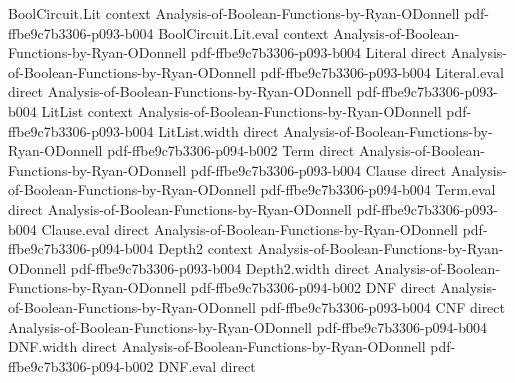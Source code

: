\begin{lemma}
\leanok
{}
\proofstep
  {BoolCircuit.Lit}
  {context}
  {Analysis-of-Boolean-Functions-by-Ryan-ODonnell}
  {pdf-ffbe9c7b3306-p093-b004}
\proofstep
  {BoolCircuit.Lit.eval}
  {context}
  {Analysis-of-Boolean-Functions-by-Ryan-ODonnell}
  {pdf-ffbe9c7b3306-p093-b004}
\proofstep
  {Literal}
  {direct}
  {Analysis-of-Boolean-Functions-by-Ryan-ODonnell}
  {pdf-ffbe9c7b3306-p093-b004}
\proofstep
  {Literal.eval}
  {direct}
  {Analysis-of-Boolean-Functions-by-Ryan-ODonnell}
  {pdf-ffbe9c7b3306-p093-b004}
\proofstep
  {LitList}
  {context}
  {Analysis-of-Boolean-Functions-by-Ryan-ODonnell}
  {pdf-ffbe9c7b3306-p093-b004}
\proofstep
  {LitList.width}
  {direct}
  {Analysis-of-Boolean-Functions-by-Ryan-ODonnell}
  {pdf-ffbe9c7b3306-p094-b002}
\proofstep
  {Term}
  {direct}
  {Analysis-of-Boolean-Functions-by-Ryan-ODonnell}
  {pdf-ffbe9c7b3306-p093-b004}
\proofstep
  {Clause}
  {direct}
  {Analysis-of-Boolean-Functions-by-Ryan-ODonnell}
  {pdf-ffbe9c7b3306-p094-b004}
\proofstep
  {Term.eval}
  {direct}
  {Analysis-of-Boolean-Functions-by-Ryan-ODonnell}
  {pdf-ffbe9c7b3306-p093-b004}
\proofstep
  {Clause.eval}
  {direct}
  {Analysis-of-Boolean-Functions-by-Ryan-ODonnell}
  {pdf-ffbe9c7b3306-p094-b004}
\proofstep
  {Depth2}
  {context}
  {Analysis-of-Boolean-Functions-by-Ryan-ODonnell}
  {pdf-ffbe9c7b3306-p093-b004}
\proofstep
  {Depth2.width}
  {direct}
  {Analysis-of-Boolean-Functions-by-Ryan-ODonnell}
  {pdf-ffbe9c7b3306-p094-b002}
\proofstep
  {DNF}
  {direct}
  {Analysis-of-Boolean-Functions-by-Ryan-ODonnell}
  {pdf-ffbe9c7b3306-p093-b004}
\proofstep
  {CNF}
  {direct}
  {Analysis-of-Boolean-Functions-by-Ryan-ODonnell}
  {pdf-ffbe9c7b3306-p094-b004}
\proofstep
  {DNF.width}
  {direct}
  {Analysis-of-Boolean-Functions-by-Ryan-ODonnell}
  {pdf-ffbe9c7b3306-p094-b002}
\proofstep
  {DNF.eval}
  {direct}

\end{lemma}
